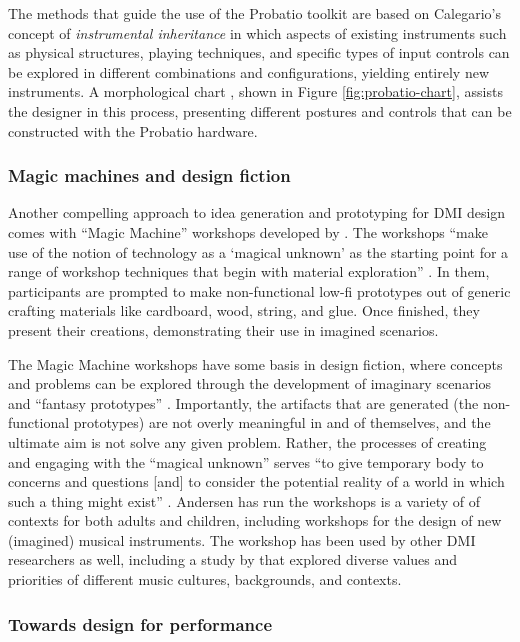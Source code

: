 \documentclass[letterpaper, 12pt]{article}
\begin{document}
The methods that guide the use of the Probatio toolkit are based on Calegario's concept of \emph{instrumental inheritance} in which aspects of existing instruments such as physical structures, playing techniques, and specific types of input controls can be explored in different combinations and configurations, yielding entirely new instruments. A morphological chart \citep{Cross2000}, shown in Figure \ref{fig:probatio-chart}, assists the designer in this process, presenting different postures and controls that can be constructed with the Probatio hardware.

\subsubsection{Magic machines and design fiction}

Another compelling approach to idea generation and prototyping for DMI design comes with ``Magic Machine'' workshops developed by \citet{Andersen2017}. The workshops ``make use of the notion of technology as a `magical unknown' as the starting point for a range of workshop techniques that begin with material exploration'' \citep[p. 4971]{Blythe2016}. In them, participants are prompted to make non-functional low-fi prototypes out of generic crafting materials like cardboard, wood, string, and glue. Once finished, they present their creations, demonstrating their use in imagined scenarios.

The Magic Machine workshops have some basis in design fiction, where concepts and problems can be explored through the development of imaginary scenarios and ``fantasy prototypes'' \citep{Sterling2009}. Importantly, the artifacts that are generated (the non-functional prototypes) are not overly meaningful in and of themselves, and the ultimate aim is not solve any given problem. Rather, the processes of creating and engaging with the ``magical unknown'' serves ``to give temporary body to concerns and questions [and] to consider the potential reality of a world in which such a thing might exist'' \citep[p. 4971]{Blythe2016}. Andersen has run the workshops is a variety of of contexts for both adults and children, including workshops for the design of new (imagined) musical instruments. The workshop has been used by other DMI researchers as well, including a study by \citet{Lepri2019} that explored diverse values and priorities of different music cultures, backgrounds, and contexts.

\subsubsection{Towards design for performance}
\label{towards-design-for-performance}
\end{document}
